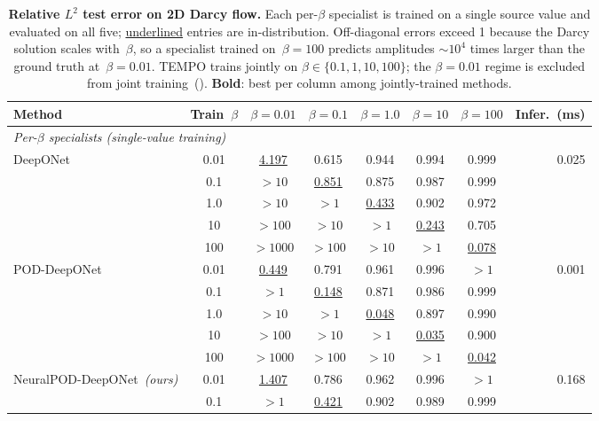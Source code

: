\documentclass[preprint,10pt]{elsarticle}
\begin{document}
\begin{table}[!htbp]
\centering
\footnotesize
\setlength{\tabcolsep}{3pt}
\caption{\textbf{Relative $L^2$ test error on 2D Darcy flow.}
  Each per-$\beta$ specialist is trained on a single source value and evaluated
  on all five; \underline{underlined} entries are in-distribution.
  Off-diagonal errors exceed 1 because the Darcy solution scales with~$\beta$,
  so a specialist trained on~$\beta{=}100$ predicts amplitudes ${\sim}10^{4}$
  times larger than the ground truth at~$\beta{=}0.01$.
  TEMPO trains jointly on $\beta\in\{0.1,1,10,100\}$; the $\beta{=}0.01$ regime
  is excluded from joint training~(\textemdash).
  \textbf{Bold}: best per column among jointly-trained methods.}
\label{tab:darcy}
\begin{tabular}{l c c c c c c r}
\toprule
Method & Train~$\beta$
  & $\beta{=}0.01$ & $\beta{=}0.1$ & $\beta{=}1.0$
  & $\beta{=}10$ & $\beta{=}100$ & Infer.~(ms) \\
\midrule
\multicolumn{8}{l}{\textit{Per-$\beta$ specialists (single-value training)}} \\[2pt]
\multirow{5}{*}{DeepONet~\cite{Lu2019}}
  & 0.01  & \underline{4.197} & 0.615 & 0.944 & 0.994 & 0.999 & \multirow{5}{*}{0.025} \\
  & 0.1   & ${>}10$  & \underline{0.851} & 0.875 & 0.987 & 0.999 & \\
  & 1.0   & ${>}10$  & ${>}1$   & \underline{0.433} & 0.902 & 0.972 & \\
  & 10    & ${>}100$ & ${>}10$  & ${>}1$   & \underline{0.243} & 0.705 & \\
  & 100   & ${>}1000$& ${>}100$ & ${>}10$  & ${>}1$   & \underline{0.078} & \\[4pt]
\multirow{5}{*}{POD-DeepONet~\cite{Lu2022}}
  & 0.01  & \underline{0.449} & 0.791 & 0.961 & 0.996 & ${>}1$ & \multirow{5}{*}{0.001} \\
  & 0.1   & ${>}1$   & \underline{0.148} & 0.871 & 0.986 & 0.999 & \\
  & 1.0   & ${>}10$  & ${>}1$   & \underline{0.048} & 0.897 & 0.990 & \\
  & 10    & ${>}100$ & ${>}10$  & ${>}1$   & \underline{0.035} & 0.900 & \\
  & 100   & ${>}1000$& ${>}100$ & ${>}10$  & ${>}1$   & \underline{0.042} & \\
\multirow{5}{*}{NeuralPOD-DeepONet~\textit{(ours)}}
  & 0.01  & \underline{1.407} & 0.786 & 0.962 & 0.996 & ${>}1$ & \multirow{5}{*}{0.168} \\
  & 0.1   & ${>}1$   & \underline{0.421} & 0.902 & 0.989 & 0.999 & \\

\end{tabular}
\end{table}
\end{document}
